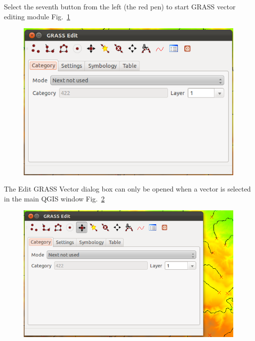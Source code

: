 Select the seventh button from the left (the red pen) to start GRASS vector editing
module Fig.~\ref{fig:qgis024}

\begin{figure}[htbp]
   \centering
   \includegraphics[scale=0.4]{qgis024.png}
   \caption{}
   \label{fig:qgis024}
\end{figure}

The Edit GRASS Vector dialog box can only be opened when a vector is
selected in the main QGIS window Fig.~\ref{fig:qgis025}

\begin{figure}[htbp]
   \centering
   \includegraphics[scale=0.35]{qgis025.png}
   \caption{}
   \label{fig:qgis025}
\end{figure}

